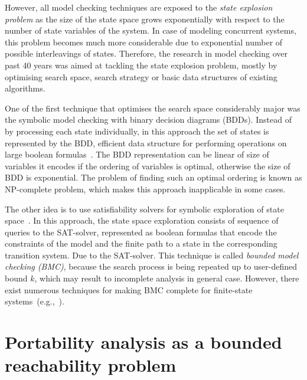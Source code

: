 However, all model checking techniques are exposed to the \textit{state explosion problem} as the size of the state space grows exponentially with respect to the number of state variables of the system. In case of modeling concurrent systems, this problem becomes much more considerable due to exponential number of possible interleavings of states.
Therefore, the research in model checking over past 40 years was aimed at tackling the state explosion problem, mostly by optimising search space, search strategy or basic data structures of existing algorithms.

One of the first technique that optimises the search space considerably major was the symbolic model checking with binary decision diagrams (BDDs). Instead of by processing each state individually, in this approach the set of states is represented by the BDD, efficient data structure for performing operations on large boolean formulas~\cite{clarke2012model}.
The BDD representation can be linear of size of variables it encodes if the ordering of variables is optimal, otherwise the size of BDD is exponential. The problem of finding such an optimal ordering is known as NP-complete problem, which makes this approach inapplicable in some cases.

The other idea is to use satisfiability solvers for symbolic exploration of state space~\cite{clarke2001bounded}. In this approach, the state space exploration consists of sequence of queries to the SAT-solver, represented as boolean formulas that encode the constraints of the model and the finite path to a state in the corresponding transition system.  
Due to the SAT-solver. This technique is called \textit{bounded model checking (BMC)}, because the search process is being repeated up to user-defined bound $k$, which may result to incomplete analysis in general case. However, there exist numerous techniques for making BMC complete for finite-state systems~(e.g.,~\cite{shtrichman2000tuning}).



\section{Portability analysis as a bounded reachability problem}
\label{ch:port:enc}

